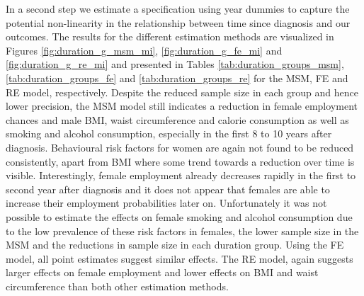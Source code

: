 In a second step we estimate a specification using year dummies to capture the potential non-linearity in the relationship between time since diagnosis and our outcomes. The results for the different estimation methods are visualized in Figures \ref{fig:duration_g_msm_mi}, \ref{fig:duration_g_fe_mi} and \ref{fig:duration_g_re_mi} and presented in Tables \ref{tab:duration_groups_msm}, \ref{tab:duration_groups_fe} and \ref{tab:duration_groups_re} for the \ac{MSM}, \ac{FE} and \ac{RE} model, respectively. Despite the reduced sample size in each group and hence lower precision, the \ac{MSM} model still indicates a reduction in female employment chances and male \ac{BMI}, waist circumference and calorie consumption as well as smoking and alcohol consumption, especially in the first 8 to 10 years after diagnosis. Behavioural risk factors for women are again not found to be reduced consistently, apart from \ac{BMI} where some trend towards a reduction over time is visible. Interestingly, female employment already decreases rapidly in the first to second year after diagnosis and it does not appear that females are able to increase their employment probabilities later on. Unfortunately it was not possible to estimate the effects on female smoking and alcohol consumption due to the low prevalence of these risk factors in females, the lower sample size in the \ac{MSM} and the reductions in sample size in each duration group. Using the \ac{FE} model, all point estimates suggest similar effects. The \ac{RE} model, again suggests larger effects on female employment and lower effects on \ac{BMI} and waist circumference than both other estimation methods. 


